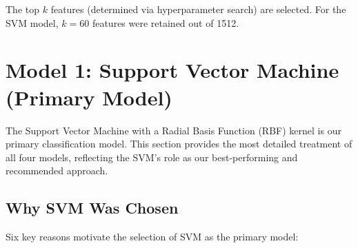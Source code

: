 \documentclass[12pt,a4paper]{article}
\begin{document}
The top $k$ features (determined via hyperparameter search) are selected. For the SVM model, $k=60$ features were retained out of 1512.

\section{Model 1: Support Vector Machine (Primary Model)}
\label{sec:svm}

The Support Vector Machine with a Radial Basis Function (RBF) kernel is our primary classification model. This section provides the most detailed treatment of all four models, reflecting the SVM's role as our best-performing and recommended approach.

\subsection{Why SVM Was Chosen}

Six key reasons motivate the selection of SVM as the primary model:
\end{document}
